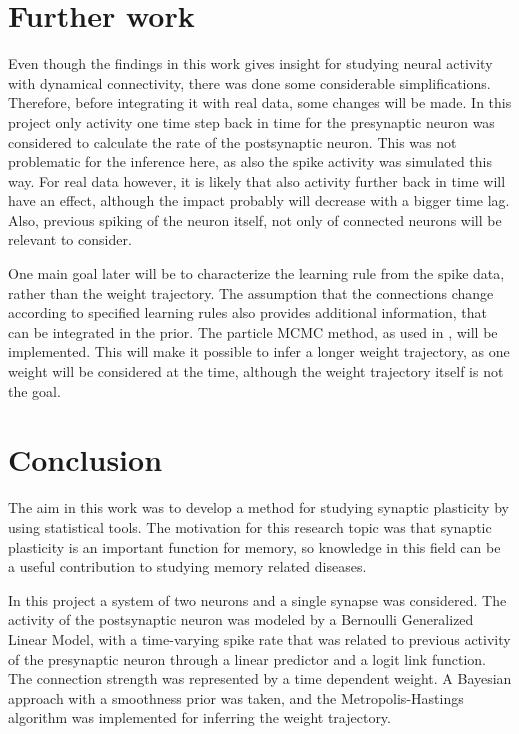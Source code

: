 \section{Further work}
\label{sec:FW}

Even though the findings in this work gives insight for studying neural activity with dynamical connectivity, there was done some considerable simplifications. Therefore, before integrating it with real data, some changes will be made. In this project only activity one time step back in time for the presynaptic neuron was considered to calculate the rate of the postsynaptic neuron. This was not problematic for the inference here, as also the spike activity was simulated this way. For real data however, it is likely that also activity further back in time will have an effect, although the impact probably will decrease with a bigger time lag. Also, previous spiking of the neuron itself, not only of connected neurons will be relevant to consider. 

One main goal later will be to characterize the learning rule from the spike data, rather than the weight trajectory. The assumption that the connections change according to specified learning rules also provides additional information, that can be integrated in the prior. The particle MCMC method, as used in \cite{Linderman}, will be implemented. This will make it possible to infer a longer weight trajectory, as one weight will be considered at the time, although the weight trajectory itself is not the goal. 


\section{Conclusion}
\label{sec:conclusion}

The aim in this work was to develop a method for studying synaptic plasticity by using statistical tools. The motivation for this research topic was that synaptic plasticity is an important function for memory, so knowledge in this field can be a useful contribution to studying memory related diseases. 

In this project a system of two neurons and a single synapse was considered. The activity of the postsynaptic neuron was modeled by a Bernoulli Generalized Linear Model, with a time-varying spike rate that was related to previous activity of the presynaptic neuron through a linear predictor and a logit link function. The connection strength was represented by a time dependent weight. A Bayesian approach with a smoothness prior was taken, and the Metropolis-Hastings algorithm was implemented for inferring the weight trajectory. 

